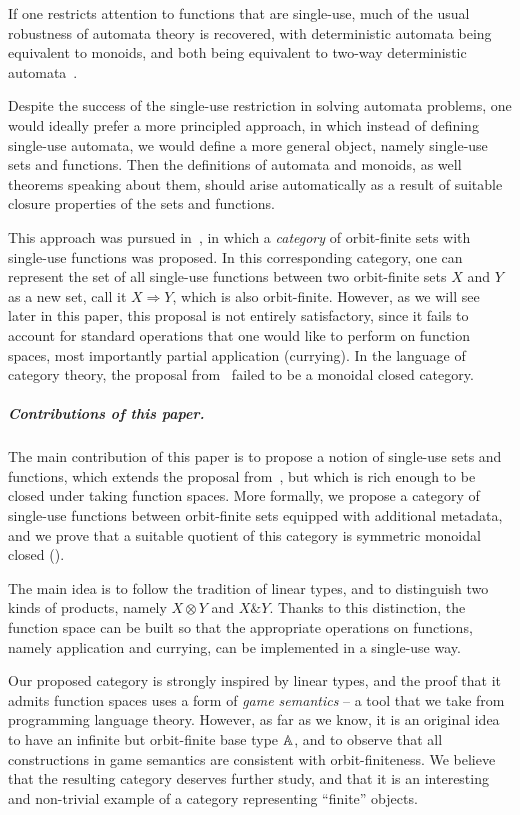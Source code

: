 \documentclass[a4paper,UKenglish,cleveref, autoref, numberwithinsect, thm-restate]{lipics-v2021}
\begin{document}
If one restricts attention to functions that are single-use, much of the usual robustness of automata theory is recovered, with deterministic automata being equivalent to monoids, and both being equivalent to two-way deterministic automata~\cite{bojanczykstefanski2020}.

Despite the success of the single-use restriction in solving automata problems, one would ideally prefer a more principled approach, in which instead of defining single-use automata, we would define a more general object, namely single-use sets and functions. Then the definitions of  automata and monoids, as well theorems speaking about them, should arise automatically as a result of suitable closure properties of the sets and functions.

This approach was pursued in~\cite{stefanski-phd}, in which a \emph{category} of orbit-finite sets with single-use functions was proposed. In this corresponding category,  one can represent the set of all single-use functions between two orbit-finite sets $X$ and $Y$ as a new set, call it $X \Rightarrow Y$, which is  also orbit-finite.  However, as we will see later in this paper, this proposal is not entirely satisfactory, since it fails to account for standard operations that one would like to perform on function spaces, most importantly partial application (currying). In the language of category theory, the proposal from~\cite{stefanski-phd} failed to be a monoidal closed category.


 \subparagraph{Contributions of this paper.}
 The main contribution of this paper is to propose a notion of single-use sets and functions, which extends the proposal from~\cite{stefanski-phd}, but which is rich enough to be closed under taking function spaces. More formally, we propose a category of single-use functions between orbit-finite sets equipped with additional metadata, and we prove that a suitable quotient of this category is symmetric monoidal closed ().

The main idea is to follow the tradition of linear types, and to  distinguish two kinds of products, namely $X \otimes Y$ and $X \& Y$. Thanks to this distinction, the function space can be built so that the appropriate operations on functions, namely application and currying, can be implemented in a single-use way.

Our proposed category is strongly inspired by linear types, and the proof that it admits function spaces uses a form of \emph{game semantics} -- a tool that we take from programming language theory. However, as far as we know, it is an original idea to have an infinite but orbit-finite base type $\mathbb A$, and to observe that all constructions in game semantics are consistent with orbit-finiteness. We believe that the resulting category deserves further study, and that it is an interesting and non-trivial example of a category representing ``finite'' objects.
\end{document}
